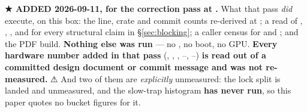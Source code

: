\documentclass[10.5pt]{article}
\begin{document}
\begin{claimbox}\small
\textbf{★ ADDED 2026-09-11, for the correction pass at .} What that pass
\emph{did} execute, on this box: the line, crate and commit counts re-derived at ;
a read of , , ,
 and  for every structural claim in
\S\ref{sec:blocking}; a caller census for  and ; and the PDF build.
\textbf{Nothing else was run} --- no , no boot, no GPU. \textbf{Every hardware
number added in that pass} (, , , --,
--) \textbf{is read out of a committed design document or commit message and
was not re-measured.} ⚠ And two of them are \emph{explicitly} unmeasured: the  lock
split is landed and unmeasured, and the  slow-trap histogram \textbf{has never run},
so this paper quotes no bucket figures for it.
\end{claimbox}
\end{document}
